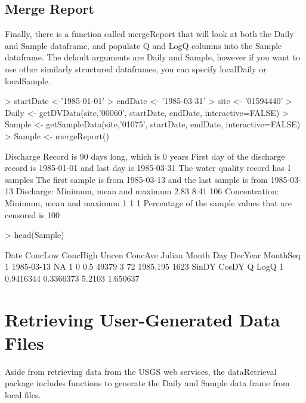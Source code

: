\documentclass[a4paper,11pt]{article}
\begin{document}
\subsection{Merge Report}
Finally, there is a function called mergeReport that will look at both the Daily and Sample dataframe, and populate Q and LogQ columns into the Sample dataframe. The default arguments are Daily and Sample, however if you want to use other similarly structured dataframes, you can specify localDaily or localSample.

\begin{Schunk}
\begin{Sinput}
> startDate <-'1985-01-01' 
> endDate <- '1985-03-31'
> site <- '01594440'
> Daily <- getDVData(site,'00060', startDate, endDate, interactive=FALSE)
> Sample <- getSampleData(site,'01075', startDate, endDate, interactive=FALSE)
> Sample <- mergeReport()
\end{Sinput}
\begin{Soutput}
 Discharge Record is 90 days long, which is 0 years
 First day of the discharge record is 1985-01-01 and last day is 1985-03-31
 The water quality record has 1 samples
 The first sample is from 1985-03-13 and the last sample is from 1985-03-13
 Discharge: Minimum, mean and maximum 2.83 8.41 106
 Concentration: Minimum, mean and maximum 1 1 1
 Percentage of the sample values that are censored is 100 %
\end{Soutput}
\begin{Sinput}
> head(Sample)
\end{Sinput}
\begin{Soutput}
        Date ConcLow ConcHigh Uncen ConcAve Julian Month Day  DecYear MonthSeq
1 1985-03-13      NA        1     0     0.5  49379     3  72 1985.195     1623
      SinDY     CosDY      Q     LogQ
1 0.9416344 0.3366373 5.2103 1.650637
\end{Soutput}
\end{Schunk}



\newpage
\section{Retrieving User-Generated Data Files}
Aside from retrieving data from the USGS web services, the dataRetrieval package includes functions to generate the Daily and Sample data frame from local files.
\end{document}
